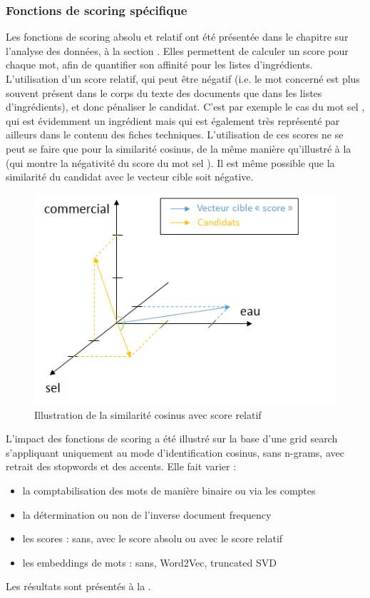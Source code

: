             \subsubsection{Fonctions de scoring spécifique}

            Les fonctions de scoring \og absolu \fg et \og relatif \fg ont été présentée dans le chapitre sur l'analyse des données, à la section .
            Elles permettent de calculer un score pour chaque mot, afin de quantifier son \og affinité \fg pour les listes d'ingrédients.
            L'utilisation d'un score relatif, qui peut être négatif (i.e. le mot concerné est plus souvent présent dans le corps du texte des documents que dans les listes d'ingrédients), et donc pénaliser le candidat. 
            C'est par exemple le cas du mot \og sel \fg, qui est évidemment un ingrédient mais qui est également très représenté par ailleurs dans le contenu des fiches techniques.
            L'utilisation de ces scores ne se peut se faire que pour la similarité cosinus, de la même manière qu'illustré à la  (qui montre la \og négativité \fg du score du mot \og sel \fg).
            Il est même possible que la similarité du candidat avec le vecteur cible soit négative.

            \begin{figure}[htbp]
                \begin{center}
                \includegraphics[width=0.6\linewidth]{img/similarite_score.png}
                \end{center}
                \caption{Illustration de la similarité cosinus avec score relatif}
                \label{fig:similarite_score}
            \end{figure}

            L'impact des fonctions de scoring a été illustré sur la base d'une grid search s'appliquant uniquement au mode d'identification cosinus, sans n-grams, avec retrait des stopwords et des accents.
            Elle fait varier :
            \begin{itemize}
                \item la comptabilisation des mots de manière binaire ou via les comptes
                \item la détermination ou non de l'inverse document frequency
                \item les scores : sans, avec le score absolu ou avec le score relatif
                \item les embeddings de mots : sans, Word2Vec, truncated SVD
            \end{itemize}
            Les résultats sont présentés à la .

